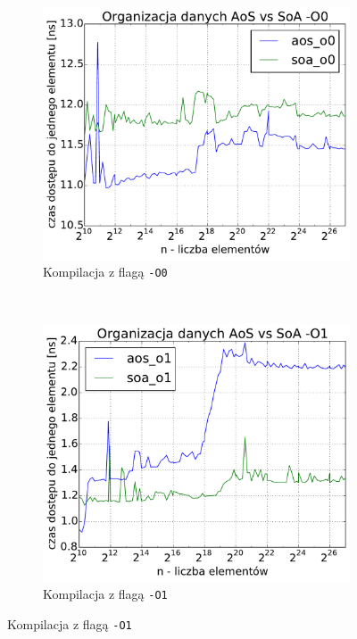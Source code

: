 \begin{figure}
    \centering
    \begin{subfigure}[c]{0.45\textwidth}
        \centering
        \includegraphics[width=\textwidth]{images/benchs_xeon/aos_vs_soa_O0}
        \caption{Kompilacja z flagą \texttt{-O0}}
    \end{subfigure}
    ~
    \begin{subfigure}[c]{0.45\textwidth}
        \centering
        \includegraphics[width=\textwidth]{images/benchs_xeon/aos_vs_soa_O1}
        \caption{Kompilacja z flagą \texttt{-O1}}

\end{subfigure}
\end{figure}
